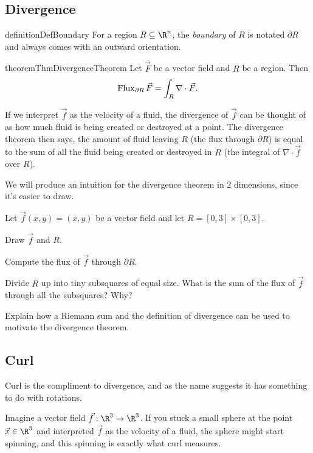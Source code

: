 \subsection*{Divergence}
\begin{restatable*}[Boundary]{definition}{DefBoundary}
	For a region $R\subseteq \R^n$, the \emph{boundary}
	of $R$ is notated $\partial R$ and always comes with an outward orientation.
\end{restatable*}

\begin{restatable*}{theorem}{ThmDivergenceTheorem}
	Let $\vec F$ be a vector field and $R$ be a region.  Then
	\[
		\operatorname{Flux}_{\partial R} \vec F = \int_{R} \nabla \cdot \vec F.
	\]
\end{restatable*}

	If we interpret $\vec f$ as the velocity
	of a fluid, the divergence of $\vec f$ can be thought of as how much fluid is being created or destroyed at a point.
	The divergence theorem then says, the amount of fluid leaving $R$ (the flux through $\partial R$) is 
	equal to the sum of all the fluid being created or destroyed in $R$ (the integral of $\nabla \cdot \vec f$
	over $R$).

	We will produce an intuition for the divergence theorem in 2 dimensions, since it's easier to draw.
	
\begin{question}
	Let $\vec f(x,y)=(x,y)$ be a vector field and let $R=[0,3]\times [0,3]$.
	\begin{parts}
		\item Draw $\vec f$ and $R$.
		\item Compute the flux of $\vec f$ through $\partial R$.
		\item Divide $R$ up into tiny subsquares of equal size.  What is the sum of
			the flux of $\vec f$ through all the subsquares?  Why?
		\item Explain how a Riemann sum and the definition of divergence can be used
			to motivate the divergence theorem.
	\end{parts}
\end{question}

\subsection*{Curl}
	Curl is the compliment to divergence, and as the name suggests it has something to do
	with rotations.

	Imagine a vector field $\vec f:\R^3\to\R^3$.  If you stuck a small sphere at the point
	$\vec x\in\R^3$ and interpreted $\vec f$ as the velocity of a fluid, the sphere might
	start spinning, and this spinning is exactly what curl measures.  

